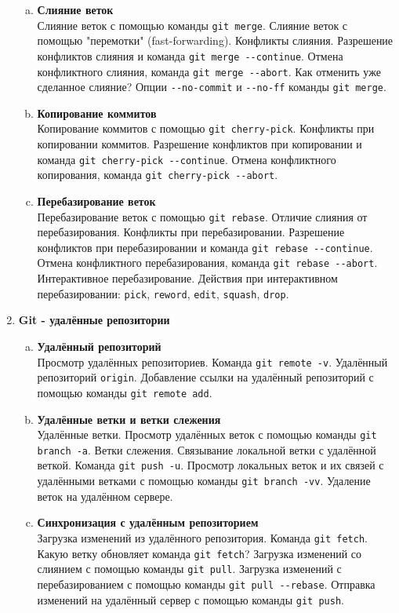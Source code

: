 \documentclass{article}
\begin{document}
\begin{enumerate}
\begin{enumerate}[a.]
\item \textbf{Слияние веток}\\
Слияние веток с помощью команды \texttt{git merge}. Слияние веток с помощью "перемотки" (fast-forwarding). Конфликты слияния. Разрешение конфликтов слияния и команда \texttt{git merge -{}-continue}. Отмена конфликтного слияния, команда \texttt{git merge -{}-abort}. Как отменить уже сделанное слияние? Опции \texttt{-{}-no-commit} и \texttt{-{}-no-ff} команды \texttt{git merge}.

\item \textbf{Копирование коммитов}\\
Копирование коммитов с помощью \texttt{git cherry-pick}. Конфликты при копировании коммитов. Разрешение конфликтов при копировании и команда \texttt{git cherry-pick -{}-continue}. Отмена конфликтного копирования, команда \texttt{git cherry-pick -{}-abort}.

\item \textbf{Перебазирование веток}\\
Перебазирование веток с помощью \texttt{git rebase}. Отличие слияния от перебазирования. Конфликты при перебазировании. Разрешение конфликтов при перебазировании и команда \texttt{git rebase -{}-continue}. Отмена конфликтного перебазирования, команда \texttt{git rebase -{}-abort}.
Интерактивное перебазирование. Действия при интерактивном перебазировании: \texttt{pick}, \texttt{reword}, \texttt{edit}, \texttt{squash}, \texttt{drop}.
\end{enumerate}


\item \textbf{Git - удалённые репозитории}
\begin{enumerate}[a.]
\item \textbf{Удалённый репозиторий}\\
Просмотр удалённых репозиториев. Команда \texttt{git remote -v}. Удалённый репозиторий \texttt{origin}. Добавление ссылки на удалённый репозиторий с помощью команды \texttt{git remote add}. 

\item \textbf{Удалённые ветки и ветки слежения}\\
Удалённые ветки. Просмотр удалённых веток с помощью команды \texttt{git branch -a}. Ветки слежения. Связывание локальной ветки с удалённой веткой. Команда \texttt{git push -u}. Просмотр локальных веток и их связей с удалёнными ветками с помощью команды \texttt{git branch -vv}. Удаление веток на удалённом сервере.

\item \textbf{Синхронизация с удалённым репозиторием}\\
Загрузка изменений из удалённого репозитория. Команда \texttt{git fetch}. Какую ветку обновляет команда \texttt{git fetch}? Загрузка изменений со слиянием с помощью команды \texttt{git pull}. Загрузка изменений с перебазированием с помощью команды \texttt{git pull -{}-rebase}. 
Отправка изменений на удалённый сервер с помощью команды \texttt{git push}.


\end{enumerate}
\end{enumerate}
\end{document}
